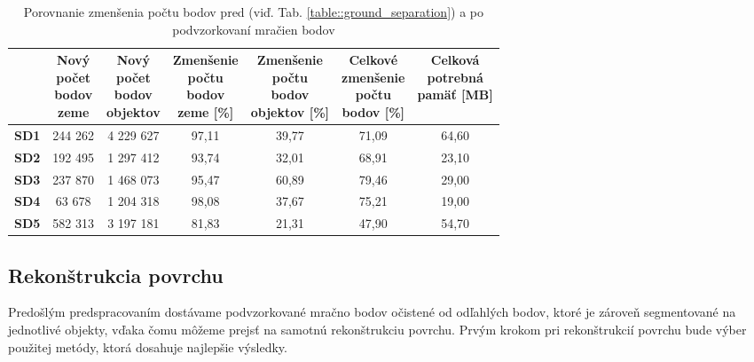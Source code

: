 \begin{table}
    \begin{center} %
        \begin{tabular}{|c || c | c | c | c | c| c|} 
         \hline
          & \thead{Nový \\ počet \\ bodov \\ zeme} &
            \thead{Nový \\ počet \\ bodov \\ objektov} &
            \thead{Zmenšenie \\ počtu \\ bodov \\ zeme [\%]} &
            \thead{Zmenšenie \\ počtu \\ bodov \\ objektov [\%]} &
            \thead{Celkové \\ zmenšenie \\ počtu \\ bodov [\%]} & 
            \thead{Celková \\ potrebná \\ pamäť [MB]} \\ [0.5ex]    
         \hline\hline
         \textbf{SD1} & 244 262  & 4 229 627 & 97,11 & 39,77 & 71,09 & 64,60  \\ 
         \hline
         \textbf{SD2} & 192 495  & 1 297 412 & 93,74 & 32,01 & 68,91 & 23,10 \\
         \hline
         \textbf{SD3} &  237 870  & 1 468 073 & 95,47 & 60,89 & 79,46 & 29,00 \\
         \hline
         \textbf{SD4} & 63 678  & 1 204 318 & 98,08 & 37,67 & 75,21 & 19,00 \\
         \hline
         \textbf{SD5} & 582 313  & 3 197 181 & 81,83 & 21,31 & 47,90 & 54,70 \\ 
         \hline
        \end{tabular}
    \caption{Porovnanie zmenšenia počtu bodov pred (viď. Tab. \ref{table::ground_separation}) a po podvzorkovaní mračien bodov}
    \label{table:subsampling}
    \end{center}
\end{table}

\subsection{Rekonštrukcia povrchu}
\noindent Predošlým predspracovaním dostávame podvzorkované mračno bodov očistené od odľahlých bodov, ktoré je zároveň segmentované na jednotlivé objekty, vďaka čomu môžeme prejsť na samotnú rekonštrukciu povrchu. Prvým krokom pri rekonštrukcií povrchu bude výber použitej metódy, ktorá dosahuje najlepšie výsledky.  

